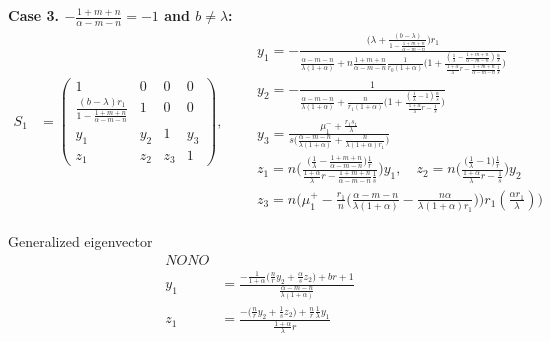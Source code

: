 \documentclass[a4paper,11pt]{article}
\def\red{\color{red}}
\begin{document}
\begin{itemize}
{\bf Case 3. $-\frac{1+m+n}{\alpha-m-n}= -1$ and $b\ne\lambda$: }
{\red
\begin{align*}
 S_1&=
 \begin{pmatrix}
    1 & 0 & 0 & 0\\
    \frac{(b-\lambda)r_1}{1-\frac{1+m+n}{\alpha-m-n}} & 1 & 0 & 0\\
    y_1 & y_2 & 1 & y_3\\
    z_1 & z_2 & z_3 &1
 \end{pmatrix}, \quad \quad 
 \begin{array}{l}
 y_1=-\frac{\Big(\lambda + \frac{(b-\lambda)}{1-\frac{1+m+n}{\alpha-m-n}}\Big)r_1}{\frac{\alpha-m-n}{\lambda(1+\alpha)} + n\frac{1+m+n}{\alpha-m-n}\frac{1}{r_0(1+\alpha)}\Big(1 + \frac{(\frac{1}{\lambda}-\frac{1+m+n}{\alpha-m-n})\frac{\alpha}{s}}{ \frac{1+\alpha}{\lambda}r -\frac{1+m+n}{\alpha-m-n} \frac{1}{s} }\Big) }\\
 y_2=-\frac{1}{\frac{\alpha-m-n}{\lambda(1+\alpha)} + \frac{n}{r_1(1+\alpha)}\Big(1 + \frac{(\frac{1}{\lambda}-1)\frac{\alpha}{s}}{ \frac{1+\alpha}{\lambda}r - \frac{1}{s} }\Big) }\\
 y_3=\frac{\mu_1^- +\frac{r_1s_1}{\lambda}}{s\Big(\frac{\alpha-m-n}{\lambda(1+\alpha)} + \frac{n}{\lambda(1+\alpha)r_1}\Big)}\\
 z_1=n\bigg(\frac{\big(\frac{1}{\lambda}-\frac{1+m+n}{\alpha-m-n}\big)\frac{1}{r}}{ \frac{1+\alpha}{\lambda}r -\frac{1+m+n}{\alpha-m-n} \frac{1}{s} }\bigg)y_1, \quad
 z_2=n\bigg(\frac{\big(\frac{1}{\lambda}-1\big)\frac{1}{r}}{ \frac{1+\alpha}{\lambda}r - \frac{1}{s} }\bigg)y_2 \\
 z_3=n\bigg(\mu_1^+-\frac{r_1}{n}\Big(\frac{\alpha-m-n}{\lambda(1+\alpha)} - \frac{n\alpha}{\lambda(1+\alpha)r_1}\Big)\bigg)r_1(\frac{\alpha r_1}{\lambda})\bigg)
 \end{array}
\end{align*}
}


Generalized eigenvector
\begin{align*}
NONO\\
 y_1 &= \frac{-\frac{1}{1+\alpha}\Big(\frac{n}{r}y_2 +\frac{\alpha}{s}z_2\Big) + br + 1}{\frac{\alpha-m-n}{\lambda(1+\alpha)}}\\
 z_1 &= \frac{-\Big(\frac{n}{r}y_2 +\frac{1}{s}z_2\Big)+ \frac{n}{r}\frac{1}{\lambda}y_1}{\frac{1+\alpha}{\lambda}r}
\end{align*}



\end{itemize}
\end{document}

